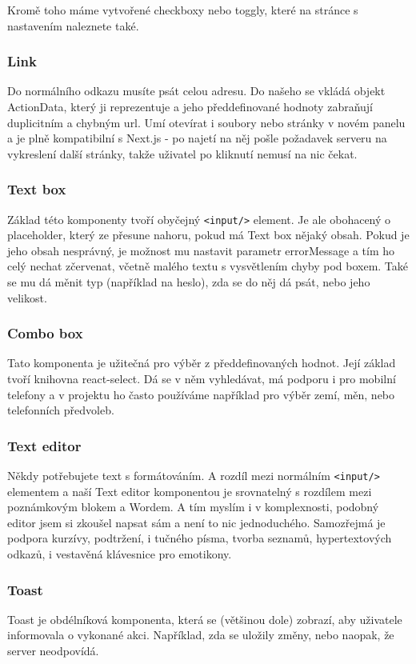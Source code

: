 Kromě toho máme vytvořené checkboxy nebo toggly, které na stránce s nastavením naleznete také.

\subsubsection{Link}
Do normálního odkazu musíte psát celou adresu. Do našeho se vkládá objekt ActionData, který ji reprezentuje a jeho předdefinované hodnoty zabraňují duplicitním a chybným url. Umí otevírat i soubory nebo stránky v novém panelu a je plně kompatibilní s Next.js - po najetí na něj pošle požadavek serveru na vykreslení další stránky, takže uživatel po kliknutí nemusí na nic čekat.

\subsubsection{Text box}
Základ této komponenty tvoří obyčejný \texttt{<input/>} element. Je ale obohacený o placeholder, který ze přesune nahoru, pokud má Text box nějaký obsah. Pokud je jeho obsah nesprávný, je možnost mu nastavit parametr errorMessage a tím ho celý nechat zčervenat, včetně malého textu s vysvětlením chyby pod boxem. Také se mu dá měnit typ (například na heslo), zda se do něj dá psát, nebo jeho velikost.

\subsubsection{Combo box}
Tato komponenta je užitečná pro výběr z předdefinovaných hodnot. Její základ tvoří knihovna react-select. Dá se v něm vyhledávat, má podporu i pro mobilní telefony a v projektu ho často používáme například pro výběr zemí, měn, nebo telefonních předvoleb.

\subsubsection{Text editor}
Někdy potřebujete text s formátováním. A rozdíl mezi normálním \texttt{<input/>} elementem a naší Text editor komponentou je srovnatelný s rozdílem mezi poznámkovým blokem a Wordem. A tím myslím i v komplexnosti, podobný editor jsem si zkoušel napsat sám a není to nic jednoduchého. Samozřejmá je podpora kurzívy, podtržení, i tučného písma, tvorba seznamů, hypertextových odkazů, i vestavěná klávesnice pro emotikony.

\subsubsection{Toast}
Toast je obdélníková komponenta, která se (většinou dole) zobrazí, aby uživatele informovala o vykonané akci. Například, zda se uložily změny, nebo naopak, že server neodpovídá.

